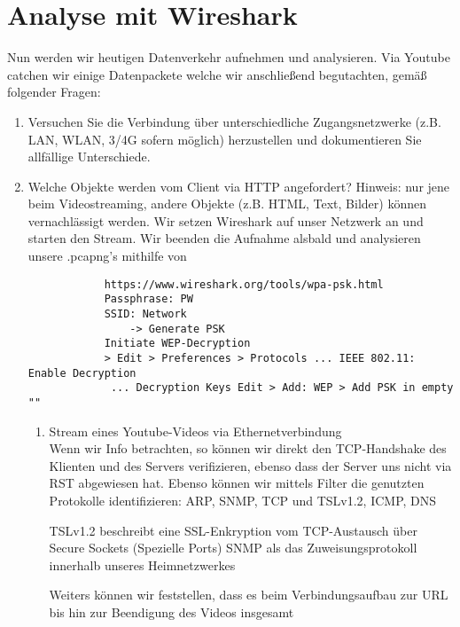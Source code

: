 \documentclass[11pt]{article}
\begin{document}
    \section{Analyse mit Wireshark}
    Nun werden wir heutigen Datenverkehr aufnehmen und analysieren. Via Youtube catchen wir
    einige Datenpackete welche wir anschließend begutachten, gemäß folgender Fragen:

    \begin{enumerate}
        \item Versuchen Sie die Verbindung über unterschiedliche Zugangsnetzwerke (z.B. LAN, WLAN, 3/4G sofern möglich) herzustellen und dokumentieren Sie allfällige Unterschiede.
        \item Welche Objekte werden vom Client via HTTP angefordert? Hinweis: nur jene beim Videostreaming, andere Objekte (z.B. HTML, Text, Bilder) können vernachlässigt werden.
            Wir setzen Wireshark auf unser Netzwerk an und starten  den Stream.
            Wir beenden die Aufnahme alsbald und analysieren unsere .pcapng's mithilfe von
        \begin{verbatim}
            https://www.wireshark.org/tools/wpa-psk.html
            Passphrase: PW
            SSID: Network
                -> Generate PSK
            Initiate WEP-Decryption
            > Edit > Preferences > Protocols ... IEEE 802.11: Enable Decryption
             ... Decryption Keys Edit > Add: WEP > Add PSK in empty ""
        \end{verbatim}
        \begin{enumerate}[\thesection .1]
            \item Stream eines Youtube-Videos via Ethernetverbindung\\
            Wenn wir Info betrachten, so können wir direkt den TCP-Handshake des Klienten und des Servers verifizieren, ebenso dass
            der Server uns nicht via RST abgewiesen hat.
            Ebenso können wir mittels Filter die genutzten Protokolle identifizieren: ARP,  SNMP, TCP und TSLv1.2, ICMP, DNS
            \begin{addmargin}[1em]{1em}
                TSLv1.2 beschreibt eine SSL-Enkryption vom TCP-Austausch über Secure Sockets (Spezielle Ports)
                SNMP als das Zuweisungsprotokoll innerhalb unseres Heimnetzwerkes
            \end{addmargin}
            Weiters können wir feststellen, dass es beim Verbindungsaufbau zur URL bis hin zur Beendigung des Videos insgesamt
            \begin{addmargin}[1em]{1em}

\end{addmargin}
\end{enumerate}
\end{enumerate}
\end{document}
